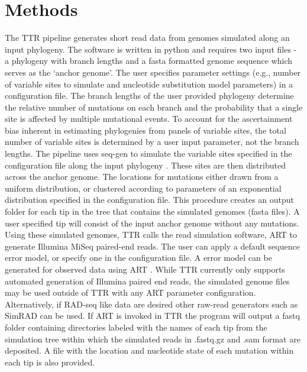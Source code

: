 \section*{Methods}
The TTR pipeline generates short read data from genomes simulated along an input phylogeny. 
The software is written in python and requires two input files - a phylogeny with branch lengths and a fasta formatted genome sequence which serves as the `anchor genome'.
The user specifies parameter settings (e.g., number of variable sites to simulate and nucleotide substitution model parameters) in a configuration file.
The branch lengths of the user provided phylogeny determine the relative number of mutations on each branch 
and the probability that a single site is affected by multiple mutational events.
To account for the ascertainment bias inherent in estimating phylogenies from panels of variable sites, 
the total number of variable sites is determined by a user input parameter, not the branch lengths.
The pipeline uses seq-gen \citep{rambaut_seq-gen:_1997} to simulate the variable sites specified in the configuration file along the input phylogeny  \citep{sukumaran_dendropy:_2010}.
These sites are then distributed across the anchor genome.
The locations for mutations either drawn from a uniform distribution, 
or clustered according to parameters of an exponential distribution specified in the configuration file. 
This procedure creates an output folder for each tip in the tree that contains the simulated genomes (fasta files).
A user specified tip will consist of the input anchor genome without any mutations.
Using these simulated genomes, 
TTR calls the read simulation software, ART \citep{huang_art:_2012} to generate Illumina MiSeq paired-end reads. 
The user can apply a default sequence error model, or specify one in the configuration file.
A error model can be generated for observed data using ART \citep{huang_art:_2012}.
While TTR currently only supports automated generation of Illumina paired end reads, the simulated genome files may be used outside of TTR with any ART parameter configuration. 
Alternatively, if RAD-seq like data are desired other raw-read generators such as SimRAD \citep{lepais_simrad:_2014} can be used. 
If ART is invoked in TTR the program will output a fastq folder containing directories labeled with the names of each tip from the 
simulation tree within which the simulated reads in .fastq.gz and .sam format are deposited. 
A file with the location and nucleotide state of each mutation within each tip is also provided.


